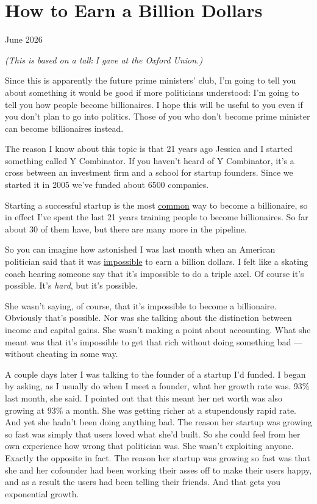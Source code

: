\chapter{How to Earn a Billion Dollars}

June 2026

\emph{(This is based on a talk I gave at the Oxford Union.)}

Since this is apparently the future prime ministers' club, I'm going to
tell you about something it would be good if more politicians
understood: I'm going to tell you how people become billionaires. I hope
this will be useful to you even if you don't plan to go into politics.
Those of you who don't become prime minister can become billionaires
instead.

The reason I know about this topic is that 21 years ago Jessica and I
started something called Y Combinator. If you haven't heard of Y
Combinator, it's a cross between an investment firm and a school for
startup founders. Since we started it in 2005 we've funded about 6500
companies.

Starting a successful startup is the most \href{richnow.html}{common}
way to become a billionaire, so in effect I've spent the last 21 years
training people to become billionaires. So far about 30 of them have,
but there are many more in the pipeline.

So you can imagine how astonished I was last month when an American
politician said that it was
\href{https://x.com/MarcoFoster_/status/2052427151371047016}{impossible}
to earn a billion dollars. I felt like a skating coach hearing someone
say that it's impossible to do a triple axel. Of course it's possible.
It's \emph{hard}, but it's possible.

She wasn't saying, of course, that it's impossible to become a
billionaire. Obviously that's possible. Nor was she talking about the
distinction between income and capital gains. She wasn't making a point
about accounting. What she meant was that it's impossible to get that
rich without doing something bad --- without cheating in some way.

A couple days later I was talking to the founder of a startup I'd
funded. I began by asking, as I usually do when I meet a founder, what
her growth rate was. 93\% last month, she said. I pointed out that this
meant her net worth was also growing at 93\% a month. She was getting
richer at a stupendously rapid rate. And yet she hadn't been doing
anything bad. The reason her startup was growing so fast was simply that
users loved what she'd built. So she could feel from her own experience
how wrong that politician was. She wasn't exploiting anyone. Exactly the
opposite in fact. The reason her startup was growing so fast was that
she and her cofounder had been working their asses off to make their
users happy, and as a result the users had been telling their friends.
And that gets you exponential growth.

